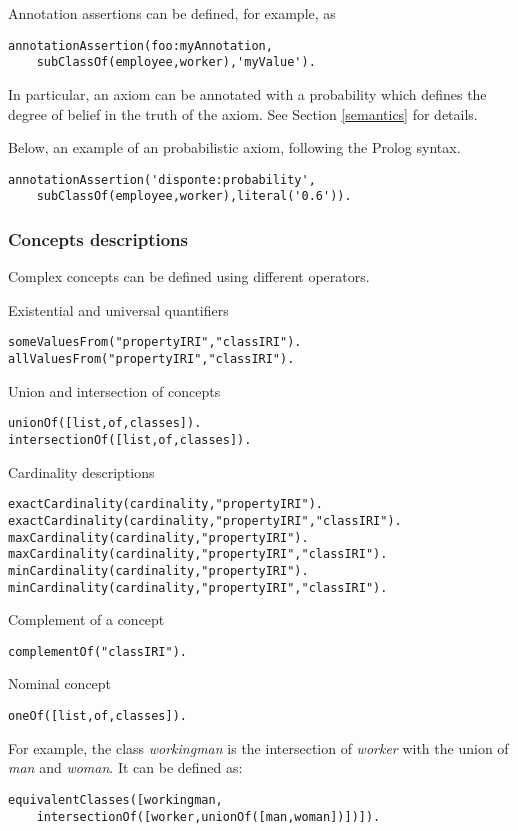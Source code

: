 Annotation assertions can be defined, for example, as
\begin{verbatim}
annotationAssertion(foo:myAnnotation,
    subClassOf(employee,worker),'myValue').
\end{verbatim}


In particular, an axiom can be annotated with a probability which defines the degree of belief in the truth of the axiom. See Section \ref{semantics} for details.


Below, an example of an probabilistic axiom, following the Prolog syntax.
\begin{verbatim}
annotationAssertion('disponte:probability',
    subClassOf(employee,worker),literal('0.6')).
\end{verbatim}

\subsubsection{Concepts descriptions}
Complex concepts can be defined using different operators.

Existential and universal quantifiers
\begin{verbatim}
someValuesFrom("propertyIRI","classIRI").
allValuesFrom("propertyIRI","classIRI").
\end{verbatim}
Union and intersection of concepts
\begin{verbatim}
unionOf([list,of,classes]).
intersectionOf([list,of,classes]).
\end{verbatim}
Cardinality descriptions
\begin{verbatim}
exactCardinality(cardinality,"propertyIRI").
exactCardinality(cardinality,"propertyIRI","classIRI").
maxCardinality(cardinality,"propertyIRI").
maxCardinality(cardinality,"propertyIRI","classIRI").
minCardinality(cardinality,"propertyIRI").
minCardinality(cardinality,"propertyIRI","classIRI").
\end{verbatim}
Complement of a concept
\begin{verbatim}
complementOf("classIRI").
\end{verbatim}
Nominal concept
\begin{verbatim}
oneOf([list,of,classes]).
\end{verbatim}
For example, the class \textit{workingman} is the intersection of \textit{worker} with the union of \textit{man} and \textit{woman}. It can be defined as:
\begin{verbatim}
equivalentClasses([workingman,
    intersectionOf([worker,unionOf([man,woman])])]).
\end{verbatim}

